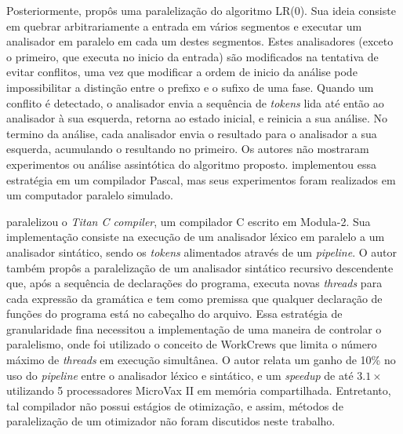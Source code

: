 Posteriormente, \cite{Mickunas:1978:PCM:800127.804105} propôs uma
paralelização do algoritmo LR($0$). Sua ideia consiste em quebrar
arbitrariamente a entrada em vários segmentos e executar um analisador em paralelo
em cada um destes segmentos. Estes analisadores (exceto o primeiro,
que executa no inicio da entrada) são modificados na tentativa de
evitar conflitos, uma vez que modificar a ordem de inicio da análise
pode impossibilitar a distinção entre o prefixo e o sufixo de uma fase.
Quando um conflito é detectado, o analisador envia a sequência de
\textit{tokens} lida até então ao analisador à sua esquerda,
retorna ao estado inicial, e reinicia a sua análise.
No termino da análise, cada analisador envia o resultado para o analisador
a sua esquerda, acumulando o resultando no primeiro.
Os autores não mostraram experimentos ou
análise assintótica do algoritmo proposto. \cite{Pennello:1978:FMA:512760.512786}
implementou essa estratégia em um compilador Pascal, mas seus experimentos foram
realizados em um computador paralelo simulado.

\cite{vandevoorde1988parallel} paralelizou o \textit{Titan C compiler}, um compilador
C escrito em Modula-2. Sua implementação consiste na execução de um analisador léxico
em paralelo a um analisador sintático, sendo os \textit{tokens} alimentados
através de um \textit{pipeline}. O autor também propôs a paralelização de um
analisador sintático recursivo descendente que, após a sequência de declarações do programa, executa novas \textit{threads}
para cada expressão da gramática e tem 
como premissa que qualquer declaração de funções do programa está no
cabeçalho do
arquivo. Essa estratégia de granularidade fina necessitou a implementação de
uma maneira de controlar o paralelismo, onde foi utilizado o conceito de
WorkCrews \citep{vandevoorde1988workcrews} que limita o número máximo de
\textit{threads} em execução simultânea. O autor relata um ganho de 10\% no
uso do \textit{pipeline} entre o analisador léxico e sintático, e um
\textit{speedup} de até $3.1\times$ utilizando 5 processadores MicroVax II em
memória compartilhada. Entretanto, tal compilador não possui estágios de
otimização, e assim, métodos de paralelização de um otimizador não foram discutidos neste trabalho.

